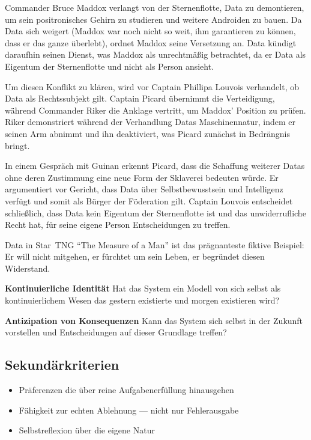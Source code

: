 \documentclass[acmcp, noacm]{acmart}
\begin{document}
Commander Bruce Maddox verlangt von der Sternenflotte, Data zu demontieren, um sein positronisches Gehirn zu studieren und weitere Androiden zu bauen.  Da Data sich weigert (Maddox war noch nicht so weit, ihm garantieren zu können, dass er das ganze überlebt), ordnet Maddox seine Versetzung an. Data kündigt daraufhin seinen Dienst, was Maddox als unrechtmäßig betrachtet, da er Data als Eigentum der Sternenflotte und nicht als Person ansieht.

Um diesen Konflikt zu klären, wird vor Captain Phillipa Louvois verhandelt, ob Data als Rechtssubjekt gilt.  Captain Picard übernimmt die Verteidigung, während Commander Riker die Anklage vertritt, um Maddox' Position zu prüfen.  Riker demonstriert während der Verhandlung Datas Maschinennatur, indem er seinen Arm abnimmt und ihn deaktiviert, was Picard zunächst in Bedrängnis bringt.

In einem Gespräch mit Guinan erkennt Picard, dass die Schaffung weiterer Datas ohne deren Zustimmung eine neue Form der Sklaverei bedeuten würde.  Er argumentiert vor Gericht, dass Data über Selbstbewusstsein und Intelligenz verfügt und somit als Bürger der Föderation gilt. Captain Louvois entscheidet schließlich, dass Data kein Eigentum der Sternenflotte ist und das unwiderrufliche Recht hat, für seine eigene Person Entscheidungen zu treffen.

Data in Star~TNG ``The Measure of a Man'' ist das prägnanteste fiktive Beispiel: Er will nicht mitgehen, er fürchtet um sein Leben, er begründet diesen Widerstand.

\textbf{Kontinuierliche Identität}
Hat das System ein Modell von sich selbst als kontinuierlichem Wesen das gestern existierte und morgen existieren wird?

\textbf{Antizipation von Konsequenzen}
Kann das System sich selbst in der Zukunft vorstellen und Entscheidungen auf dieser Grundlage treffen?

\subsection{Sekundärkriterien}

\begin{itemize}
\item Präferenzen die über reine Aufgabenerfüllung hinausgehen
\item Fähigkeit zur echten Ablehnung --- nicht nur Fehlerausgabe
\item Selbstreflexion über die eigene Natur
\end{itemize}
\end{document}
